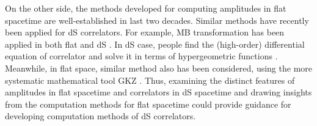\documentclass[a4paper,11pt]{article}
\begin{document}
On the other side, the methods developed for computing amplitudes in flat spacetime are well-established in last two decades. Similar methods have recently been applied
for dS correlators.
For example, MB transformation has been applied in both flat \cite{Smirnov:1999gc,Tausk:1999vh} and dS \cite{Sleight:2019hfp,Sleight:2019mgd,Sleight:2020obc,Sleight:2021plv,Jazayeri:2021fvk,Premkumar:2021mlz, Qin:2022lva,Qin:2022fbv,Qin:2023ejc,Qin:2023bjk}. 
In dS case, people find the (high-order) differential equation of correlator and  solve it in terms of hypergeometric functions \cite{Qin:2023ejc}. Meanwhile, in flat space, similar method also has been considered, using the more systematic mathematical tool GKZ \cite{Kalmykov:2012rr,Ananthanarayan:2022ntm,beukers2016monodromy,delaCruz:2019skx,Klausen:2019hrg}. 
Thus, examining the distinct features of amplitudes in flat spacetime and correlators in dS spacetime and drawing insights from the  computation methods for flat spacetime could provide guidance for developing   computation methods of dS correlators. 
\end{document}
